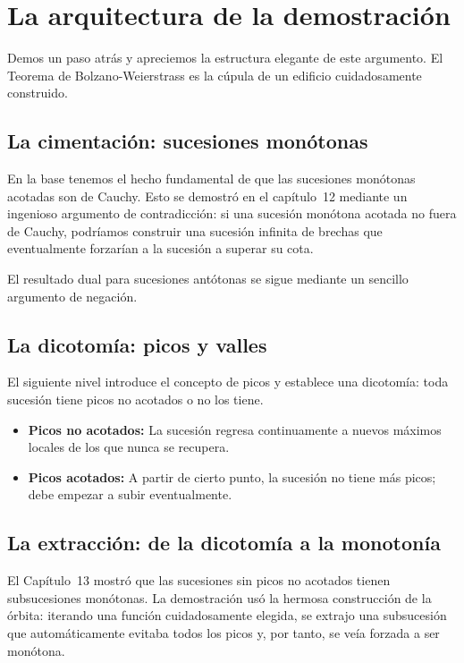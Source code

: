 \section{La arquitectura de la demostración}

Demos un paso atrás y apreciemos la estructura elegante de este
argumento. El Teorema de Bolzano-Weierstrass es la cúpula de un
edificio cuidadosamente construido.

\subsection{La cimentación: sucesiones monótonas}

En la base tenemos el hecho fundamental de que las sucesiones monótonas
acotadas son de Cauchy. Esto se demostró en el capítulo~12 mediante
un ingenioso argumento de contradicción: si una sucesión monótona
acotada no fuera de Cauchy, podríamos construir una sucesión infinita
de brechas que eventualmente forzarían a la sucesión a superar su cota.

El resultado dual para sucesiones antótonas se sigue mediante un
sencillo argumento de negación.

\subsection{La dicotomía: picos y valles}

El siguiente nivel introduce el concepto de picos y establece una
dicotomía: toda sucesión tiene picos no acotados o no los tiene.

\begin{itemize}
  \item \textbf{Picos no acotados:} La sucesión regresa continuamente a
        nuevos máximos locales de los que nunca se recupera.
  \item \textbf{Picos acotados:} A partir de cierto punto, la sucesión
        no tiene más picos; debe empezar a subir eventualmente.
\end{itemize}

\subsection{La extracción: de la dicotomía a la monotonía}

El Capítulo~13 mostró que las sucesiones sin picos no acotados
tienen subsucesiones monótonas. La demostración usó la hermosa
construcción de la órbita: iterando una función cuidadosamente
elegida, se extrajo una subsucesión que automáticamente evitaba todos
los picos y, por tanto, se veía forzada a ser monótona.

